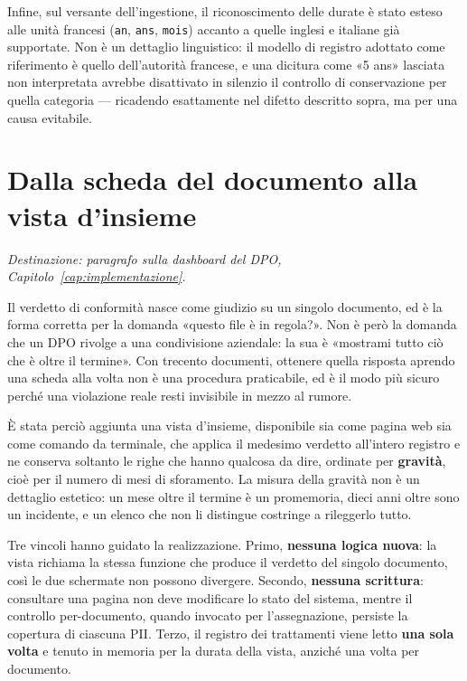 Infine, sul versante dell'ingestione, il riconoscimento delle durate è stato esteso alle unità francesi (\texttt{an}, \texttt{ans}, \texttt{mois}) accanto a quelle inglesi e italiane già supportate. Non è un dettaglio linguistico: il modello di registro adottato come riferimento è quello dell'autorità francese, e una dicitura come «5 ans» lasciata non interpretata avrebbe disattivato in silenzio il controllo di conservazione per quella categoria --- ricadendo esattamente nel difetto descritto sopra, ma per una causa evitabile.


\section{Dalla scheda del documento alla vista d'insieme}
\label{sec:sv-vista-conservazione}

\textit{Destinazione: paragrafo sulla dashboard del DPO, Capitolo~\ref{cap:implementazione}.} \medskip

Il verdetto di conformità nasce come giudizio su un singolo documento, ed è la forma corretta per la domanda «questo file è in regola?». Non è però la domanda che un DPO rivolge a una condivisione aziendale: la sua è «mostrami tutto ciò che è oltre il termine». Con trecento documenti, ottenere quella risposta aprendo una scheda alla volta non è una procedura praticabile, ed è il modo più sicuro perché una violazione reale resti invisibile in mezzo al rumore. \medskip

È stata perciò aggiunta una vista d'insieme, disponibile sia come pagina web sia come comando da terminale, che applica il medesimo verdetto all'intero registro e ne conserva soltanto le righe che hanno qualcosa da dire, ordinate per \textbf{gravità}, cioè per il numero di mesi di sforamento. La misura della gravità non è un dettaglio estetico: un mese oltre il termine è un promemoria, dieci anni oltre sono un incidente, e un elenco che non li distingue costringe a rileggerlo tutto. \medskip

Tre vincoli hanno guidato la realizzazione. Primo, \textbf{nessuna logica nuova}: la vista richiama la stessa funzione che produce il verdetto del singolo documento, così le due schermate non possono divergere. Secondo, \textbf{nessuna scrittura}: consultare una pagina non deve modificare lo stato del sistema, mentre il controllo per-documento, quando invocato per l'assegnazione, persiste la copertura di ciascuna PII. Terzo, il registro dei trattamenti viene letto \textbf{una sola volta} e tenuto in memoria per la durata della vista, anziché una volta per documento. \medskip

